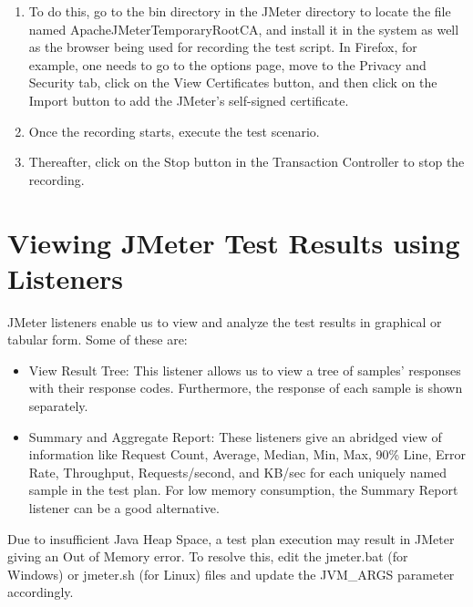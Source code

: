 \documentclass[12pt]{article}
\begin{document}
\begin{enumerate}
	\item To do this, go to the bin directory in the JMeter directory to locate the file named ApacheJMeterTemporaryRootCA, and install it in the system as well as the browser being used for recording the test script. In Firefox, for example, one needs to go to the options page, move to the Privacy and Security tab, click on the View Certificates button, and then click on the Import button to add the JMeter's self-signed certificate.
	\item Once the recording starts, execute the test scenario.
	\item Thereafter, click on the Stop button in the Transaction Controller to stop the recording.
\end{enumerate}
\par
\section*{Viewing JMeter Test Results using Listeners}
JMeter listeners enable us to view and analyze the test results in graphical or tabular form. Some of these are:
\begin{itemize}
	\item View Result Tree: This listener allows us to view a tree of samples' responses with their response codes. Furthermore, the response of each sample is shown separately.
	\item Summary and Aggregate Report: These listeners give an abridged view of information like Request Count, Average, Median, Min, Max, 90\% Line, Error Rate, Throughput, Requests/second, and KB/sec for each uniquely named sample in the test plan. For low memory consumption, the Summary Report listener can be a good alternative.
\end{itemize}
\par
Due to insufficient Java Heap Space, a test plan execution may result in JMeter giving an Out of Memory error. To resolve this, edit the jmeter.bat (for Windows) or jmeter.sh (for Linux) files and update the JVM\_ARGS parameter accordingly.
\\
\par
\end{document}
